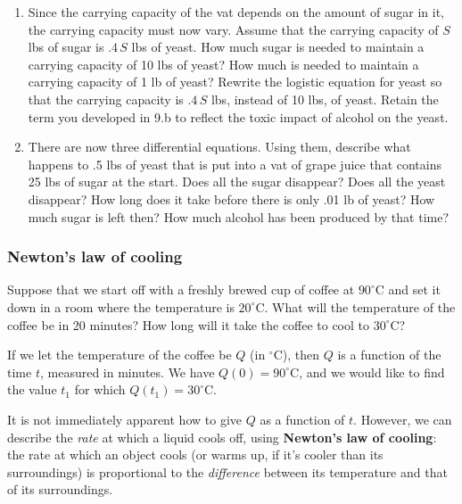 \begin{enumerate}
  \begin{enumerate}
  \item Since the carrying capacity of the vat depends on the amount of sugar in it, the carrying capacity must now vary.  Assume that the carrying capacity of $S$ lbs of sugar is $.4\,S$ lbs of yeast.  How much sugar is needed to maintain a carrying capacity of 10 lbs of yeast?  How much is needed to maintain a carrying capacity of 1 lb of yeast?  Rewrite the logistic equation for yeast so that the carrying capacity is $.4\,S$ lbs, instead of 10 lbs, of yeast.  Retain the term you developed in 9.b to reflect the toxic impact of alcohol on the yeast.

  \item There are now three differential equations.  Using them, describe what happens to .5 lbs of yeast that is put into a vat of grape juice that contains 25 lbs of sugar at the start.  Does all the sugar disappear?  Does all the yeast disappear?  How long does it take before there is only .01 lb of yeast?  How much sugar is left then?  How much alcohol has been produced by that time?
\label{ferment-end}

\end{enumerate}
\end{enumerate}
\subsubsection{Newton's law of cooling}  
\label{subsubsec:newtons-law-of-cooling}
\label{cooling coffee}

Suppose that we start off with a freshly brewed cup of coffee at
\mbox{$90^{\circ}$C} and set it down in a room where the temperature
is \mbox{$20^{\circ}$C}.  What will the temperature of the coffee be
in 20 minutes?  How long will it take the coffee to cool to
\mbox{$30^{\circ}$C}?

If we let the temperature of the coffee be $Q$ (in $^{\circ}$C), then
$Q$ is a function of the time $t$, measured in minutes.  We have $Q(0)
= 90^{\circ}$C, and we would like to find the value $t_1$ for which
$Q(t_1) = 30^{\circ}$C.

It is not immediately apparent how to give $Q$ as a function of $t$.
However, we can describe the {\em rate\/} at which a liquid cools off,
using {\bf Newton's law of cooling}:
the rate at which an object cools (or warms up, if it's cooler than
its surroundings) is proportional to the {\em difference\/} between
its temperature and that of its surroundings.


